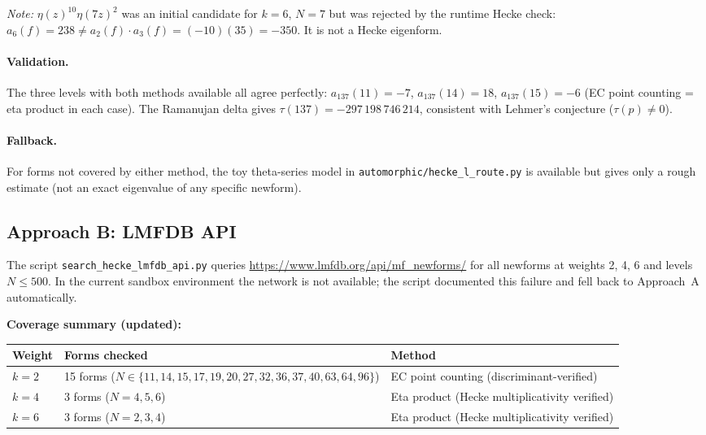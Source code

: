 \documentclass[12pt,a4paper]{article}
\begin{document}
\noindent\textit{Note:} $\eta(z)^{10}\eta(7z)^2$ was an initial candidate for
$k=6$, $N=7$ but was rejected by the runtime Hecke check:
$a_6(f) = 238 \ne a_2(f)\cdot a_3(f) = (-10)(35) = -350$.
It is not a Hecke eigenform.

\paragraph{Validation.}
The three levels with both methods available all agree perfectly:
$a_{137}(11) = -7$, $a_{137}(14) = 18$, $a_{137}(15) = -6$
(EC point counting = eta product in each case).
The Ramanujan delta gives $\tau(137) = -297\,198\,746\,214$, consistent with
Lehmer's conjecture ($\tau(p)\ne 0$).

\paragraph{Fallback.}
For forms not covered by either method, the toy theta-series model in
\texttt{automorphic/hecke\_l\_route.py} is available but gives only a rough
estimate (not an exact eigenvalue of any specific newform).

\subsection{Approach B: LMFDB API}

The script \texttt{search\_hecke\_lmfdb\_api.py} queries
\url{https://www.lmfdb.org/api/mf_newforms/}
for all newforms at weights 2, 4, 6 and levels $N \le 500$.
In the current sandbox environment the network is not available;
the script documented this failure and fell back to Approach~A automatically.

\bigskip
\noindent
\textbf{Coverage summary (updated):}
\begin{center}
\begin{tabular}{lll}
\toprule
Weight & Forms checked & Method \\
\midrule
$k=2$ & 15 forms ($N \in \{11,14,15,17,19,20,27,32,36,37,40,63,64,96\}$) & EC point counting (discriminant-verified) \\
$k=4$ & 3 forms ($N=4,5,6$) & Eta product (Hecke multiplicativity verified) \\
$k=6$ & 3 forms ($N=2,3,4$) & Eta product (Hecke multiplicativity verified) \\
\bottomrule
\end{tabular}
\end{center}
\end{document}
